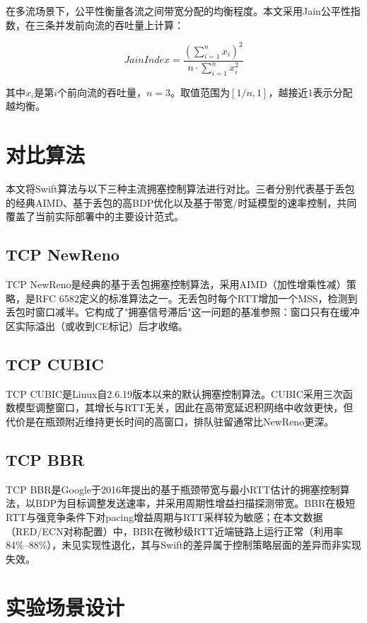 在多流场景下，公平性衡量各流之间带宽分配的均衡程度。本文采用Jain公平性指数，在三条并发前向流的吞吐量上计算：

\begin{equation}
JainIndex = \frac{(\sum_{i=1}^{n} x_i)^2}{n \cdot \sum_{i=1}^{n} x_i^2}
\end{equation}

其中$x_i$是第$i$个前向流的吞吐量，$n=3$。取值范围为$[1/n, 1]$，越接近1表示分配越均衡。

\section{对比算法}

本文将Swift算法与以下三种主流拥塞控制算法进行对比。三者分别代表基于丢包的经典AIMD、基于丢包的高BDP优化以及基于带宽/时延模型的速率控制，共同覆盖了当前实际部署中的主要设计范式。

\subsection{TCP NewReno}

TCP NewReno是经典的基于丢包拥塞控制算法，采用AIMD（加性增乘性减）策略，是RFC 6582定义的标准算法之一。无丢包时每个RTT增加一个MSS，检测到丢包时窗口减半。它构成了"拥塞信号滞后"这一问题的基准参照：窗口只有在缓冲区实际溢出（或收到CE标记）后才收缩。

\subsection{TCP CUBIC}

TCP CUBIC是Linux自2.6.19版本以来的默认拥塞控制算法。CUBIC采用三次函数模型调整窗口，其增长与RTT无关，因此在高带宽延迟积网络中收敛更快，但代价是在瓶颈附近维持更长时间的高窗口，排队驻留通常比NewReno更深。

\subsection{TCP BBR}

TCP BBR是Google于2016年提出的基于瓶颈带宽与最小RTT估计的拥塞控制算法，以BDP为目标调整发送速率，并采用周期性增益扫描探测带宽。BBR在极短RTT与强竞争条件下对pacing增益周期与RTT采样较为敏感；在本文数据（RED/ECN对称配置）中，BBR在微秒级RTT近端链路上运行正常（利用率84\%--88\%），未见实现性退化，其与Swift的差异属于控制策略层面的差异而非实现失效。

\section{实验场景设计}

